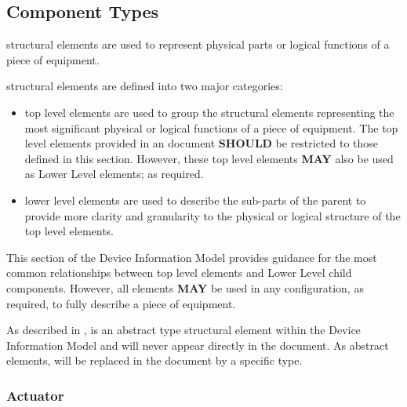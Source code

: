 \subsection{Component Types} \label{sec:Component Types}


 \glspl{structural element} are used to represent physical parts or logical functions of a piece of equipment.

 \glspl{structural element} are defined into two major categories:


\begin{itemize}
    \item \gls{top level}  elements are used to group the \glspl{structural element} representing the most significant physical or logical functions of a piece of equipment.  The \gls{top level}  elements provided in an  document \textbf{SHOULD} be restricted to those defined in this section.  However, these \gls{top level}  elements \textbf{MAY} also be used as \gls{Lower Level}  elements; as required.

    \item \gls{lower level}  elements are used to describe the sub-parts of the parent  to provide more clarity and granularity to the physical or logical structure of the \gls{top level}  elements.

\end{itemize}

This section of the \gls{Device Information Model} provides guidance for the most common relationships between \gls{top level}  elements and \gls{Lower Level} child components.  However, all  elements \textbf{MAY} be used in any configuration, as required, to fully describe a piece of equipment.

As described in ,  is an abstract type \gls{structural element} within the \gls{Device Information Model} and will never appear directly in the  document.  As abstract elements,  will be replaced in the document by a specific  type.


\subsubsection{Actuator}
\label{sec:Actuator}



